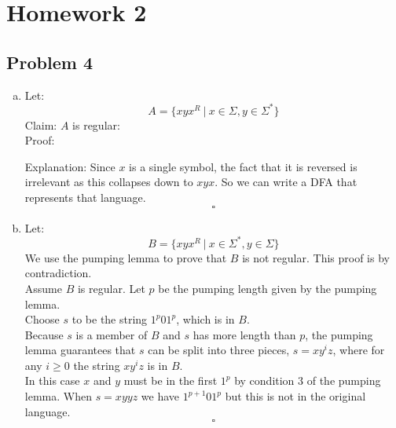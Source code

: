 \documentclass{article}
\begin{document}
\newpage
\section*{Homework 2}

\subsection*{Problem 4}
\begin{enumerate}[a)]
    \item Let: \[A = \{xyx^R ~|~ x \in \Sigma, y \in \Sigma^*\}\]
        Claim: $A$ is regular: \\
        Proof: \\


    Explanation:
    Since $x$ is a single symbol, the fact that it is reversed is irrelevant as this collapses
    down to $xyx$. So we can write a DFA that represents that language.
    \[\square\]

    \item Let: \[B = \{xyx^R ~|~ x \in \Sigma^*, y \in \Sigma\}\]
    We use the pumping lemma to prove that $B$ is not regular.
    This proof is by contradiction.\\
    Assume $B$ is regular. Let $p$ be the pumping length given by the pumping lemma. \\
    Choose $s$ to be the string $1^p01^p$, which is in $B$. \\
    Because $s$ is a member of $B$ and $s$ has more length than $p$,
    the pumping lemma guarantees that $s$ can be split into three pieces,
    $s = xy^iz$, where for any $i \geq 0$ the string $xy^iz$ is in $B$. \\
    In this case $x$ and $y$ must be in the first $1^p$ by condition 3 of the pumping lemma.
    When $s = xyyz$ we have $1^{p+1}01^p$ but this is not in the original language.
    \[\square\]


\end{enumerate}
\end{document}
